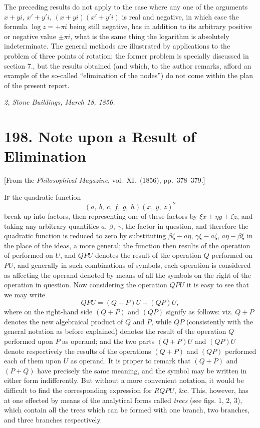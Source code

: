\documentclass[11pt,a4paper]{book}
\begin{document}
\medskip

The preceding results do not apply to the case where any one of the arguments
$x+yi$, $x'+y'i$, $(x+yi)(x'+y'i)$ is real and negative, in which case the formula
$\log z = +\pi i$ being still negative, has in addition to its arbitrary positive
or negative value $\pm\pi i$, what is the same thing the logarithm is absolutely indeterminate.
The general methods are illustrated by applications to the problem of
three points of rotation; the former problem is specially discussed
in section 7., but the results obtained (and which, to the author remarks, afford an
example of the so-called ``elimination of the nodes'') do not come within the plan of
the present report.

\bigskip

\noindent\textit{2, Stone Buildings, March 18, 1856.}

\newpage


\section*{198. Note upon a Result of Elimination}

\begin{center}
[From the \textit{Philosophical Magazine}, vol.~XI.~(1856), pp.~378--379.]
\end{center}

\bigskip

I\textsc{f} the quadratic function
\[
(a,\ b,\ c,\ f,\ g,\ h)(x,\ y,\ z)^2
\]
break up into factors, then representing one of these factors by $\xi x + \eta y + \zeta z$, and taking
any arbitrary quantities $a$, $\beta$, $\gamma$, the factor in question, and therefore the quadratic
function is reduced to zero by substituting $\beta\zeta - a\eta$, $\gamma\xi - a\zeta$, $a\eta - \beta\xi$ in the place of
the ideas, a more general; the function then results of the operation of performed on
$U$, and $QPU$ denotes the result of the operation $Q$ performed on $PU$, and generally
in such combinations of symbols, each operation is considered as affecting the operand
denoted by means of all the symbols on the right of the operation in question. Now
considering the operation $QPU$ it is easy to see that we may write
\[
QPU = (Q + P)U + (QP)U,
\]
where on the right-hand side $(Q + P)$ and $(QP)$ signify as follows: viz. $Q + P$ denotes
the new algebraical product of $Q$ and $P$, while $QP$ (consistently with the general
notation as before explained) denotes the result of the operation $Q$ performed upon
$P$ as operand; and the two parts $(Q + P)U$ and $(QP)U$ denote respectively the
results of the operations $(Q + P)$ and $(QP)$ performed each of them upon $U$ as operand.
It is proper to remark that $(Q + P)$ and $(P+Q)$ have precisely the same meaning,
and the symbol may be written in either form indifferently. But without a more
convenient notation, it would be difficult to find the corresponding expression for
$RQPU$, \&c. This, however, has at one effected by means of the analytical forms
called \textit{trees} (see figs. 1, 2, 3), which contain all the trees which can be formed with
one branch, two branches, and three branches respectively.
\end{document}
